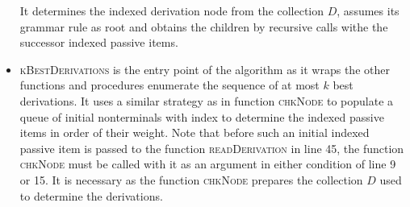 \documentclass[../document.tex]{subfiles}
\begin{document}
\begin{itemize}
            It determines the indexed derivation node from the collection \(D\), assumes its grammar rule as root and obtains the children by recursive calls withe the successor indexed passive items.
        \item \textsc{kBestDerivations} is the entry point of the algorithm as it wraps the other functions and procedures enumerate the sequence of at most \(k\) best derivations.
            It uses a similar strategy as in function \textsc{chkNode} to populate a queue of initial nonterminals with index to determine the indexed passive items in order of their weight.
            Note that before such an initial indexed passive item is passed to the function \textsc{readDerivation} in line 45, the function \textsc{chkNode} must be called with it as an argument in either condition of line 9 or 15.
            It is necessary as the function \textsc{chkNode} prepares the collection \(D\) used to determine the derivations.
    \end{itemize}
    
\end{document}
